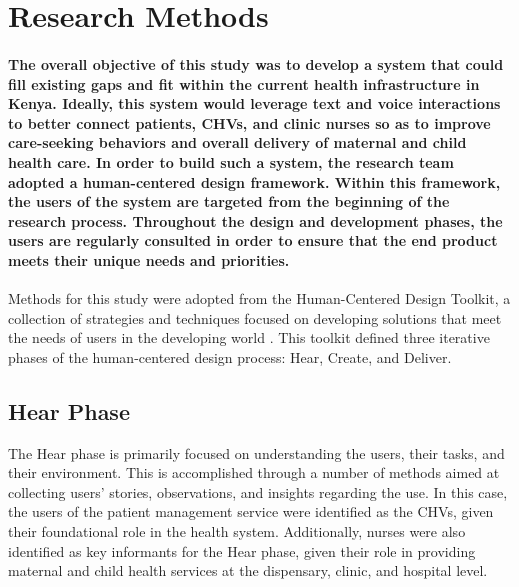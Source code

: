 \section{Research Methods}

\paragraph{The overall objective of this study was to develop a system that could fill existing gaps and fit within the current health infrastructure in Kenya. Ideally, this system would leverage text and voice interactions to better connect patients, CHVs, and clinic nurses so as to improve care-seeking behaviors and overall delivery of maternal and child health care. In order to build such a system, the research team adopted a human-centered design framework. Within this framework, the users of the system are targeted from the beginning of the research process. Throughout the design and development phases, the users are regularly consulted in order to ensure that the end product meets their unique needs and priorities.}

Methods for this study were adopted from the Human-Centered Design Toolkit, a collection of strategies and techniques focused on developing solutions that meet the needs of users in the developing world \citep{HCDToolkit}. This toolkit defined three iterative phases of the human-centered design process: Hear, Create, and Deliver. 

\subsection{Hear Phase}
The Hear phase is primarily focused on understanding the users, their tasks, and their environment. This is accomplished through a number of methods aimed at collecting users' stories, observations, and insights regarding the use. In this case, the users of the patient management service were identified as the CHVs, given their foundational role in the health system. Additionally, nurses were also identified as key informants for the Hear phase, given their role in providing maternal and child health services at the dispensary, clinic, and hospital level. 

